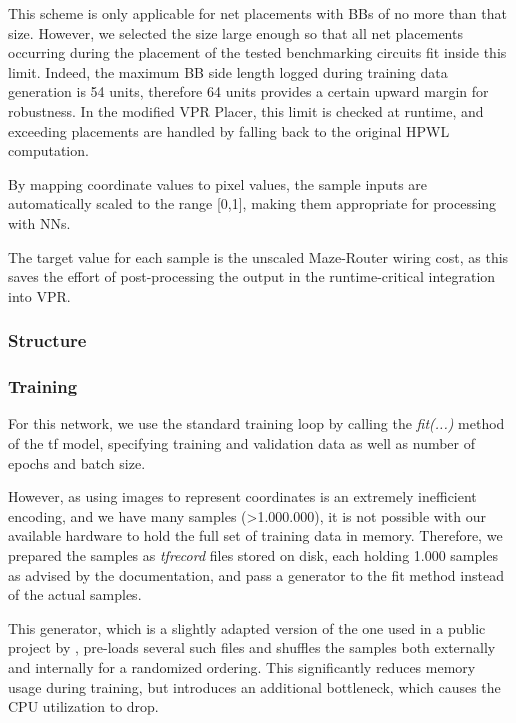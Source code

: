 This scheme is only applicable for net placements with \glspl{BB} of no more than that size. However, we selected the size large enough so that all net placements occurring during the placement of the tested benchmarking circuits fit inside this limit. Indeed, the maximum \gls{BB} side length logged during training data generation is 54 units, therefore 64 units provides a certain upward margin for robustness. In the modified \gls{VPR} Placer, this limit is checked at runtime, and exceeding placements are handled by falling back to the original \gls{HPWL} computation.

By mapping coordinate values to pixel values, the sample inputs are automatically scaled to the range [0,1], making them appropriate for processing with \glspl{NN}.

The target value for each sample is the unscaled Maze-Router wiring cost, as this saves the effort of post-processing the output in the runtime-critical integration into \gls{VPR}.\cite{TODO}

\subsubsection{Structure}

\subsubsection{Training}

For this network, we use the standard training loop by calling the \textit{fit(...)} method of the \gls{tf} model, specifying training and validation data as well as number of epochs and batch size.

However, as using images to represent coordinates is an extremely inefficient encoding, and we have many samples (>1.000.000), it is not possible with our available hardware to hold the full set of training data in memory. Therefore, we prepared the samples as \textit{tfrecord} files stored on disk, each holding 1.000 samples as advised by the documentation\cite{TODO}, and pass a generator to the fit method instead of the actual samples.

This generator, which is a slightly adapted version of the one used in a public project by \cite{TODO}, pre-loads several such files and shuffles the samples both externally and internally for a randomized ordering. This significantly reduces memory usage during training, but introduces an additional bottleneck, which causes the CPU utilization to drop.

